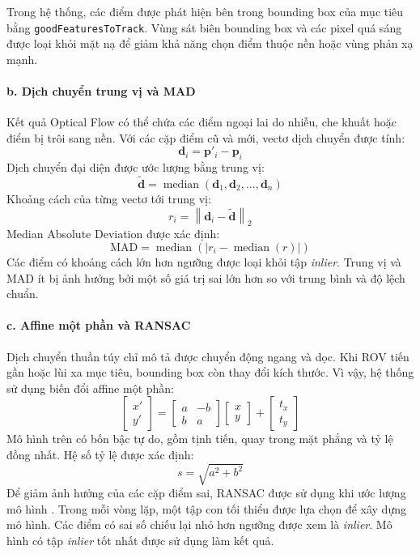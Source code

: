 \documentclass[../DoAn.tex]{subfiles}
\begin{document}
Trong hệ thống, các điểm được phát hiện bên trong bounding box của mục tiêu bằng \texttt{goodFeaturesToTrack}. Vùng sát biên bounding box và các pixel quá sáng được loại khỏi mặt nạ để giảm khả năng chọn điểm thuộc nền hoặc vùng phản xạ mạnh.

\paragraph{b. Dịch chuyển trung vị và MAD}
Kết quả Optical Flow có thể chứa các điểm ngoại lai do nhiễu, che khuất hoặc điểm bị trôi sang nền. Với các cặp điểm cũ và mới, vectơ dịch chuyển được tính:
\[
\mathbf{d}_i = \mathbf{p}'_i - \mathbf{p}_i
\]
Dịch chuyển đại diện được ước lượng bằng trung vị:
\[
\widetilde{\mathbf{d}} = \operatorname{median}\left(\mathbf{d}_1, \mathbf{d}_2, \ldots, \mathbf{d}_n\right)
\]
Khoảng cách của từng vectơ tới trung vị:
\[
r_i = \left\|\mathbf{d}_i - \widetilde{\mathbf{d}}\right\|_2
\]
Median Absolute Deviation được xác định:
\[
\mathrm{MAD} = \operatorname{median}\left(\left|r_i - \operatorname{median}(r)\right|\right)
\]
Các điểm có khoảng cách lớn hơn ngưỡng được loại khỏi tập \textit{inlier}. Trung vị và MAD ít bị ảnh hưởng bởi một số giá trị sai lớn hơn so với trung bình và độ lệch chuẩn.

\paragraph{c. Affine một phần và RANSAC}
Dịch chuyển thuần túy chỉ mô tả được chuyển động ngang và dọc. Khi ROV tiến gần hoặc lùi xa mục tiêu, bounding box còn thay đổi kích thước. Vì vậy, hệ thống sử dụng biến đổi affine một phần:
\[
\begin{bmatrix}
x' \\ y'
\end{bmatrix}
=
\begin{bmatrix}
a & -b \\
b & a
\end{bmatrix}
\begin{bmatrix}
x \\ y
\end{bmatrix}
+
\begin{bmatrix}
t_x \\ t_y
\end{bmatrix}
\]
Mô hình trên có bốn bậc tự do, gồm tịnh tiến, quay trong mặt phẳng và tỷ lệ đồng nhất. Hệ số tỷ lệ được xác định:
\[
s = \sqrt{a^2 + b^2}
\]
Để giảm ảnh hưởng của các cặp điểm sai, RANSAC được sử dụng khi ước lượng mô hình \cite{fischler_bolles1981}. Trong mỗi vòng lặp, một tập con tối thiểu được lựa chọn để xây dựng mô hình. Các điểm có sai số chiếu lại nhỏ hơn ngưỡng được xem là \textit{inlier}. Mô hình có tập \textit{inlier} tốt nhất được sử dụng làm kết quả.
\end{document}
